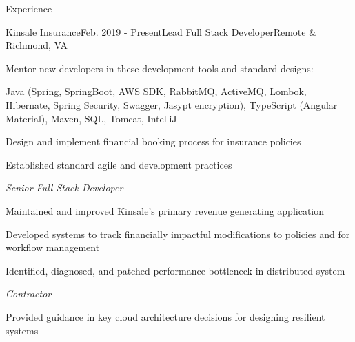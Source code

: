 \documentclass{resume} %
\begin{document}

\begin{rSection}{Experience}

\begin{rSubsection}{Kinsale Insurance}{Feb. 2019 - Present}{\vspace{-0.5em}Lead Full Stack Developer}{Remote \& Richmond, VA}
	\setlength{\itemindent}{.0in}\item{
		Mentor new developers in these development tools and standard designs:
	}
	\setlength{\itemindent}{.0in}\item{
		Java (Spring, SpringBoot, AWS SDK, RabbitMQ, ActiveMQ, Lombok, Hibernate, Spring Security, Swagger, Jasypt encryption), TypeScript (Angular Material), Maven, SQL, Tomcat, IntelliJ
	}
	\setlength{\itemindent}{.0in}\item{
		Design and implement financial booking process for insurance policies
	}
	\setlength{\itemindent}{.0in}\item{
		Established standard agile and development practices 
	}
	

    \emph{Senior Full Stack Developer}
    \setlength{\itemindent}{.0in}\item{
    	Maintained and improved Kinsale's primary revenue generating application
    }
	\setlength{\itemindent}{.0in}\item{ 
		Developed systems to track financially impactful modifications to policies and for workflow management
	}
	\setlength{\itemindent}{.0in}\item{
		Identified, diagnosed, and patched performance bottleneck in distributed system
	}
	
	
	\emph{Contractor}
	\setlength{\itemindent}{.0in}\item{ 
		
	}
	\setlength{\itemindent}{.0in}\item{ 
		Provided guidance in key cloud architecture decisions for designing resilient systems
	}
	
	
\end{rSubsection}



\end{rSection}
\end{document}
